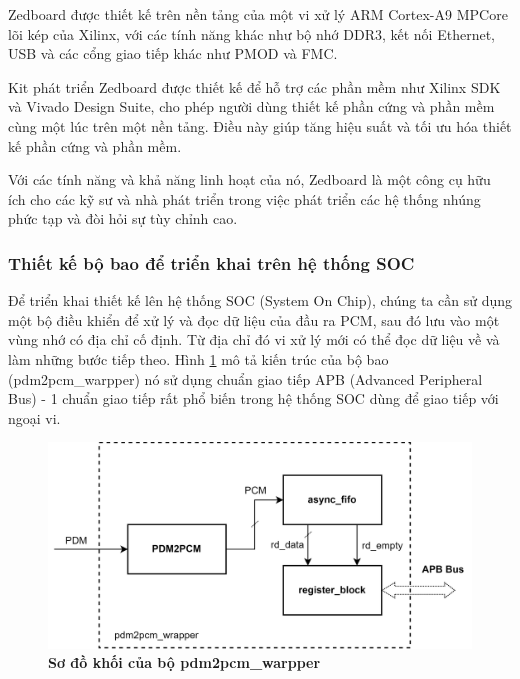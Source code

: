 Zedboard được thiết kế trên nền tảng của một vi xử lý ARM Cortex-A9 MPCore lõi kép của Xilinx, với các tính năng khác như bộ nhớ DDR3, kết nối Ethernet, USB và các cổng giao tiếp khác như PMOD và FMC. 


Kit phát triển Zedboard được thiết kế để hỗ trợ các phần mềm như Xilinx SDK và Vivado Design Suite, cho phép người dùng thiết kế phần cứng và phần mềm cùng một lúc trên một nền tảng. Điều này giúp tăng hiệu suất và tối ưu hóa thiết kế phần cứng và phần mềm.

Với các tính năng và khả năng linh hoạt của nó, Zedboard là một công cụ hữu ích cho các kỹ sư và nhà phát triển trong việc phát triển các hệ thống nhúng phức tạp và đòi hỏi sự tùy chỉnh cao.



\subsubsection{Thiết kế bộ bao để triển khai trên hệ thống SOC} \label{wrapper_cha}

Để triển khai thiết kế lên hệ thống SOC (System On Chip), chúng ta cần sử dụng một bộ điều khiển để xử lý và đọc dữ liệu của đầu ra PCM, sau đó lưu vào một vùng nhớ có địa chỉ cố định. Từ địa chỉ đó vi xử lý mới có thể đọc dữ liệu về và làm những bước tiếp theo. Hình \ref{wrapper} mô tả kiến trúc của bộ bao (pdm2pcm\_warpper) nó sử dụng chuẩn giao tiếp APB (Advanced Peripheral Bus) -  1 chuẩn giao tiếp rất phổ biến trong hệ thống SOC dùng để giao tiếp với ngoại vi.

\begin{figure}[H]
    \centering
    \includegraphics[width=13cm]{Images/Chuong5/fpga/wrapper.png}
    \caption[Sơ đồ khối của bộ pdm2pcm\_warpper]{\bfseries \fontsize{12pt}{0pt}\selectfont Sơ đồ khối của bộ pdm2pcm\_warpper}
    \label{wrapper}
\end{figure}

